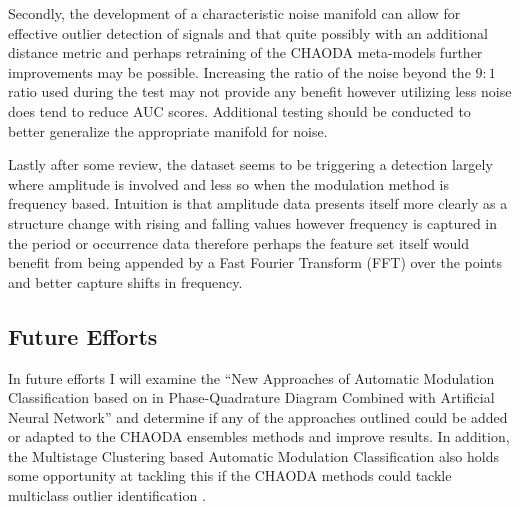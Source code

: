 \documentclass[conference]{IEEEtran}
\begin{document}
Secondly, the development of a characteristic noise manifold can allow for effective outlier detection of signals and that quite possibly with an additional distance metric and perhaps retraining of the CHAODA meta-models further improvements may be possible. Increasing the ratio of the noise beyond the $9:1$ ratio used during the test may not provide any benefit however utilizing less noise does tend to reduce AUC scores. Additional testing should be conducted to better generalize the appropriate manifold for noise.

Lastly after some review, the dataset seems to be triggering a detection largely where amplitude is involved and less so when the modulation method is frequency based.  Intuition is that amplitude data presents itself more clearly as a structure change with rising and falling values however frequency is captured in the period or occurrence data therefore perhaps the feature set itself would benefit from being appended by a Fast Fourier Transform (FFT) over the points and better capture shifts in frequency.

\subsection{Future Efforts}
In future efforts I will examine the “New Approaches of Automatic Modulation Classification based on in Phase-Quadrature Diagram Combined with Artificial Neural Network” \cite{b12} and determine if any of the approaches outlined could be added or adapted to the CHAODA ensembles methods and improve results. In addition, the Multistage Clustering based Automatic Modulation Classification also holds some opportunity at tackling this if the CHAODA methods could tackle multiclass outlier identification \cite{b13}.  
\end{document}
